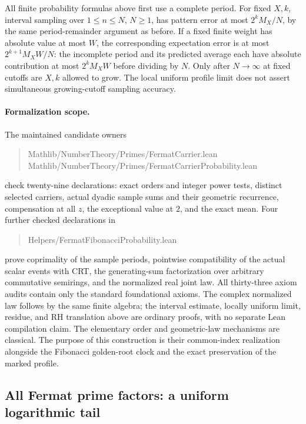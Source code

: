 \documentclass[11pt]{article}
\theoremstyle{definition}
\begin{document}
All finite probability formulas above first use a complete period.
For fixed $X,k$, interval sampling over $1\le n\le N$, $N\ge1$,
has pattern error at most $2^kM_X/N$, by the same period-remainder
argument as before. If a fixed finite weight has absolute value
at most $W$, the corresponding expectation error is at most
$2^{k+1}M_XW/N$: the incomplete period and its predicted average
each have absolute contribution at most $2^kM_XW$ before
dividing by $N$.
Only after $N\to\infty$ at fixed cutoffs are $X,k$ allowed to grow.
The local uniform profile limit does not assert simultaneous
growing-cutoff sampling accuracy.

\paragraph{Formalization scope.}
The maintained candidate owners
\begin{quote}\small\ttfamily
Mathlib/NumberTheory/Primes/FermatCarrier.lean\\
Mathlib/NumberTheory/Primes/FermatCarrierProbability.lean
\end{quote}
check twenty-nine declarations: exact orders and integer power
tests, distinct selected carriers, actual dyadic sample sums and
their geometric recurrence, compensation at all $z$, the
exceptional value at $2$, and the exact mean.
Four further checked declarations in
\begin{quote}\small\ttfamily
Helpers/FermatFibonacciProbability.lean
\end{quote}
prove coprimality of the sample periods, pointwise compatibility
of the actual scalar events with CRT, the generating-sum
factorization over arbitrary commutative semirings, and the
normalized real joint law. All thirty-three axiom audits contain
only the standard foundational axioms. The complex normalized
law follows by the same finite algebra; the interval estimate,
locally uniform limit, residue, and RH translation above are
ordinary proofs, with no separate Lean compilation claim.
The elementary order and geometric-law mechanisms are classical.
The purpose of this construction is
their common-index realization alongside the Fibonacci golden-root
clock and the exact preservation of the marked profile.

\subsection{All Fermat prime factors: a uniform logarithmic tail}
\label{sec:all-fermat-factors}
\end{document}
